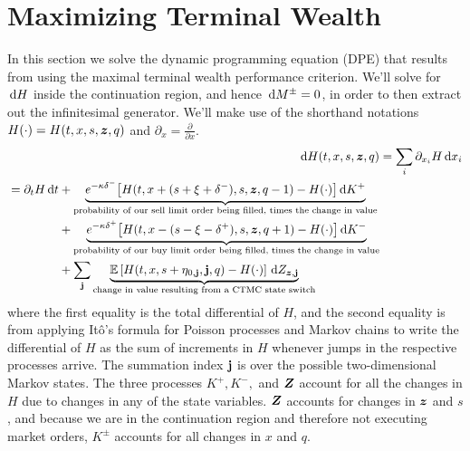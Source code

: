 \section{Maximizing Terminal Wealth}
In this section we solve the dynamic programming equation (DPE) that results from using the maximal terminal wealth performance criterion. We'll solve for $\,\mathrm{d} H$ inside the continuation region, and hence $\,\mathrm{d} M^{\pm} = 0$, in order to then extract out the infinitesimal generator. We'll make use of the shorthand notations $H(\cdot) = H(t,x,s,\bm{z},q)$ and $\partial_{x} = \frac{\partial}{\partial x}$.
\begin{align}
\d H (t,x,s,\bz,q) & = \sum\limits_i \partial_{x_i} H \dx_i \\
\begin{split}
& = \partial_t H \dt + \underbrace{e^{ -\kappa \delta^{-}} \bigl[ H(t,x+(s+\xi+\delta^-),s,\bz,q-1) - H(\cdot) \bigr] \d K^+}_{\text{probability of our sell limit order being filled, times the change in value}} \\
& \hphantom{{}={} \partial_t H \dt} + \underbrace{e^{ -\kappa \delta^{+}} \bigl[ H(t,x-(s-\xi-\delta^+),s,\bz,q+1) - H(\cdot) \bigr] \d K^-}_{\text{probability of our buy limit order being filled, times the change in value}} \\
& \hphantom{{}={} \partial_t H \dt} + \sum_{\bj} \underbrace{\E \left[ H(t,x,s+\eta_{0,\bj},\bj,q) - H(\cdot) \right] \d Z_{\bz,\bj}}_{\text{change in value resulting from a CTMC state switch}}
\end{split}
\end{align}
where the first equality is the total differential of $H$, and the second equality is from applying It{\^o}'s formula for Poisson processes and Markov chains to write the differential of $H$ as the sum of increments in $H$ whenever jumps in the respective processes arrive. The summation index $\mathbf{j}$ is over the possible two-dimensional Markov states. The three processes $K^+, K^-,$ and $\bm{Z}$ account for all the changes in $H$ due to changes in any of the state variables. $\bm{Z}$ accounts for changes in $\bm{z}$ and $s$, and because we are in the continuation region and therefore not executing market orders, $K^\pm$ accounts for all changes in $x$ and $q$.

